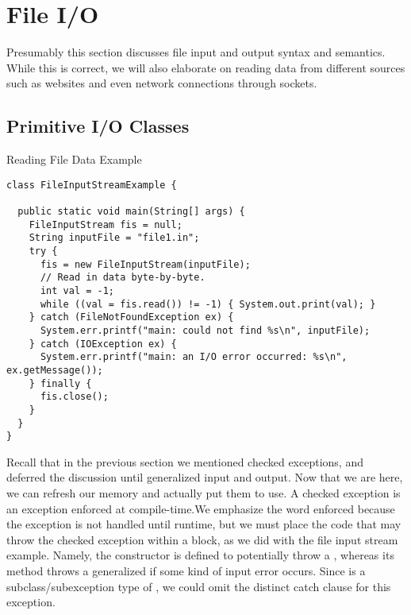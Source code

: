 \section{File I/O}

Presumably this section discusses file input and output syntax and semantics. While this is correct, we will also elaborate on reading data from different sources such as websites and even network connections through sockets. 

\subsection*{Primitive I/O Classes}



\begin{cl}{Reading File Data Example}
\begin{lstlisting}[language=MyJava]
class FileInputStreamExample {

  public static void main(String[] args) {
    FileInputStream fis = null;
    String inputFile = "file1.in";
    try {
      fis = new FileInputStream(inputFile);
      // Read in data byte-by-byte.
      int val = -1;
      while ((val = fis.read()) != -1) { System.out.print(val); }
    } catch (FileNotFoundException ex) {
      System.err.printf("main: could not find %s\n", inputFile);
    } catch (IOException ex) {
      System.err.printf("main: an I/O error occurred: %s\n", ex.getMessage());
    } finally {
      fis.close();
    } 
  } 
}
\end{lstlisting}
\end{cl}

Recall that in the previous section we mentioned checked exceptions, and deferred the discussion until generalized input and output. Now that we are here, we can refresh our memory and actually put them to use. A checked exception is an exception enforced at compile-time.We emphasize the word enforced because the exception is not handled until runtime, but we must place the code that may throw the checked exception within a  block, as we did with the file input stream example. Namely, the  constructor is defined to potentially throw a , whereas its  method throws a generalized  if some kind of input error occurs. Since  is a subclass/subexception type of , we could omit the distinct catch clause for this exception. 

